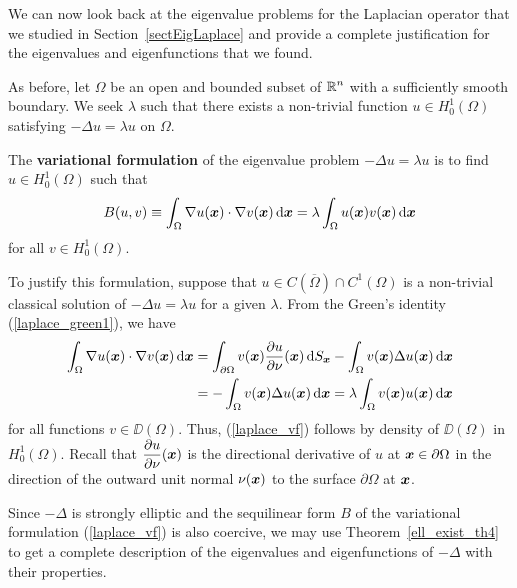 We can now look back at the eigenvalue problems for the Laplacian
operator that we studied in Section~\ref{sectEigLaplace} and provide a
complete justification for the eigenvalues and eigenfunctions that we
found.

As before, let $\Omega$ be an open and bounded subset of
$\displaystyle \mathbb{R}^n$ with a sufficiently smooth boundary.
We seek $\lambda$ such that there exists a non-trivial
function $\displaystyle u \in H^1_0(\Omega)$ satisfying
$-\Delta u = \lambda u$ on $\Omega$.

The {\bfseries variational formulation}%
 of the eigenvalue problem
$-\Delta u = \lambda u$ is to find
$\displaystyle u \in H^1_0(\Omega)$ such that
\begin{equation} \label{laplace_vf}
B(u,v) \equiv \int_{\Omega} \nabla u({\bm{x}})\cdot \nabla v({\bm{x}})
\,\mathrm{d}{{\bm{x}}}
= \lambda \int_{\Omega} u({\bm{x}}) v({\bm{x}}) \,\mathrm{d}{{\bm{x}}}
\end{equation}
for all $\displaystyle v \in H^1_0(\Omega)$.

To justify this formulation, suppose that
$\displaystyle u \in C(\overline{\Omega})\cap C^1(\Omega)$ is a
non-trivial classical solution of $-\Delta u = \lambda u$ for a given $\lambda$.
From the Green's identity (\ref{laplace_green1}), we have
\begin{align*}
\int_\Omega \nabla u({\bm{x}}) \cdot \nabla v({\bm{x}}) \,\mathrm{d}{{\bm{x}}}
&= \int_{\partial \Omega} v({\bm{x}})
\frac{\partial{u}}{\partial \nu}({\bm{x}}) \,\mathrm{d}{S}_{{\bm{x}}} -
\int_{\Omega} v({\bm{x}}) \Delta u({\bm{x}}) \,\mathrm{d}{{\bm{x}}} \\
&= - \int_{\Omega} v({\bm{x}}) \Delta u({\bm{x}}) \,\mathrm{d}{{\bm{x}}}
= \lambda \int_{\Omega} v({\bm{x}}) u({\bm{x}}) \,\mathrm{d}{{\bm{x}}}
\end{align*}
for all functions $v \in \DD(\Omega)$.  Thus,
(\ref{laplace_vf}) follows by density of $\DD(\Omega)$ in
$\displaystyle H_0^1(\Omega)$.  Recall that
$\displaystyle \frac{\partial{u}}{\partial \nu}({\bm{x}})$ is the directional
derivative of $u$ at ${\bm{x}}\in \partial \Omega$ in the direction of
the outward unit normal $\nu({\bm{x}})$ to the surface
$\partial \Omega$ at ${\bm{x}}$.

Since $-\Delta$ is strongly elliptic and the sequilinear form $B$ of
the variational formulation (\ref{laplace_vf}) is also coercive, we
may use Theorem~\ref{ell_exist_th4} to get a complete description of
the eigenvalues and eigenfunctions of $-\Delta$ with their properties.

